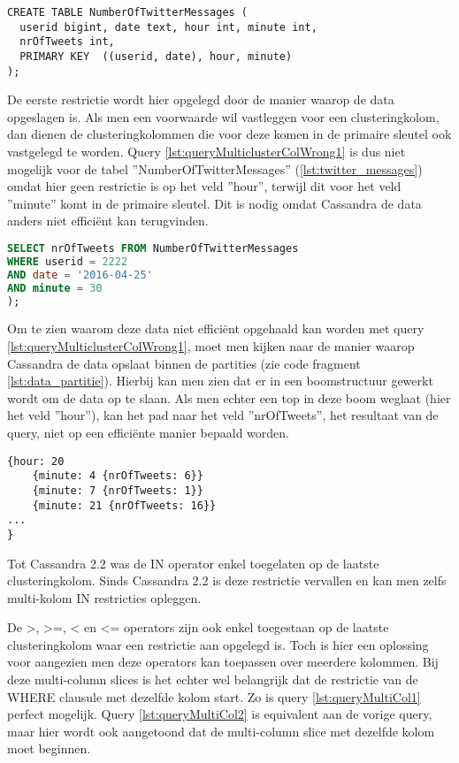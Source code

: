 \begin{lstlisting}[caption={Layout van de tabel NumberOfTwitterMessages}, label={lst:twitter_messages}]
CREATE TABLE NumberOfTwitterMessages (
  userid bigint, date text, hour int, minute int,
  nrOfTweets int,
  PRIMARY KEY  ((userid, date), hour, minute)
);

\end{lstlisting}

De eerste restrictie wordt hier opgelegd door de manier waarop de data opgeslagen is.
Als men een voorwaarde wil vastleggen voor een clusteringkolom, dan dienen de clusteringkolommen die voor deze komen in de primaire sleutel ook vastgelegd te worden.
Query \ref{lst:queryMulticlusterColWrong1} is dus niet mogelijk voor de tabel ''NumberOfTwitterMessages'' (\ref{lst:twitter_messages}) omdat hier geen restrictie is op het veld ''hour'', terwijl dit voor het veld ''minute'' komt in de primaire sleutel.
Dit is nodig omdat Cassandra de data anders niet efficiënt kan terugvinden.

\begin{lstlisting}[caption={Foutieve query bij meerdere partitiekolommen}, label={lst:queryMulticlusterColWrong1}, language=SQL]
SELECT nrOfTweets FROM NumberOfTwitterMessages
WHERE userid = 2222
AND date = '2016-04-25'
AND minute = 30
);
\end{lstlisting}

Om te zien waarom deze data niet efficiënt opgehaald kan worden met query \ref{lst:queryMulticlusterColWrong1}, moet men kijken naar de manier waarop Cassandra de data opslaat binnen de partities (zie code fragment \ref{lst:data_partitie}).
Hierbij kan men zien dat er in een boomstructuur gewerkt wordt om de data op te slaan.
Als men echter een top in deze boom weglaat (hier het veld ''hour''), kan het pad naar het veld ''nrOfTweets'', het resultaat van de query, niet op een efficiënte manier bepaald worden.

\begin{lstlisting}[caption={Data opslag binnen een partitie}, label={lst:data_partitie}]
{hour: 20 
	{minute: 4 {nrOfTweets: 6}} 
	{minute: 7 {nrOfTweets: 1}}
	{minute: 21 {nrOfTweets: 16}}
...
}
\end{lstlisting}

Tot Cassandra 2.2 was de IN operator enkel toegelaten op de laatste clusteringkolom.
Sinds Cassandra 2.2 is deze restrictie vervallen en kan men zelfs multi-kolom IN restricties opleggen.

De >, >=, < en <= operators zijn ook enkel toegestaan op de laatste clusteringkolom waar een restrictie aan opgelegd is.
Toch is hier een oplossing voor aangezien men deze operators kan toepassen over meerdere kolommen.
Bij deze multi-column slices is het echter wel belangrijk dat de restrictie van de WHERE clausule met dezelfde kolom start.
Zo is query \ref{lst:queryMultiCol1} perfect mogelijk.
Query \ref{lst:queryMultiCol2} is equivalent aan de vorige query, maar hier wordt ook aangetoond dat de multi-column slice met dezelfde kolom moet beginnen.

